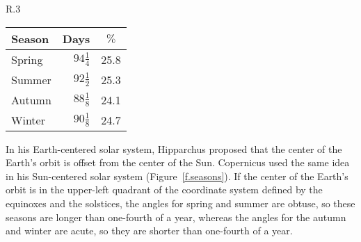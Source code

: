\begin{wrapfigure}{R}{.3\textwidth}
\begin{sffamily}
\renewcommand{\arraystretch}{1.3}
\begin{tabular}{|l|r|r|}
\hline
Season & \multicolumn{1}{|c|}{Days}&\multicolumn{1}{|c|}{$\%$}\\\hline\hline
Spring & $94\frac{1}{4}$ & 25.8\\\hline
Summer & $92\frac{1}{2}$ & 25.3\\\hline
Autumn & $88\frac{1}{8}$ & 24.1\\\hline
Winter & $90\frac{1}{8}$ & 24.7\\\hline
\end{tabular}
\end{sffamily}
\end{wrapfigure}

In his Earth-centered solar system, Hipparchus proposed that the center of the Earth's orbit is offset from the center of the Sun. Copernicus used the same idea in his Sun-centered solar system (Figure~\ref{f.seasons}). If the center of the Earth's orbit is in the upper-left quadrant of the coordinate system defined by the equinoxes and the solstices, the angles for spring and summer are obtuse, so these seasons are longer than one-fourth of a year, whereas the angles for the autumn and winter are acute, so they are shorter than one-fourth of a year.

%
%
%
%
%

